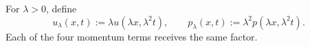 For \(\lambda>0\), define
\[
  u_\lambda(x,t):=\lambda u(\lambda x,\lambda^2t),
  \qquad
  p_\lambda(x,t):=\lambda^2p(\lambda x,\lambda^2t).
\]
Each of the four momentum terms receives the same factor.
